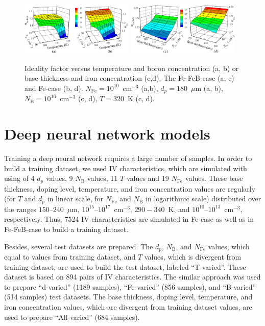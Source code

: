 \documentclass[num-refs]{wiley-article} %
\begin{document}
\begin{figure}[t]
\centering
\includegraphics[width=0.48\textwidth]{Fig1a}
\includegraphics[width=0.48\textwidth]{Fig1b}
\caption{Ideality factor versus temperature and boron concentration (a, b)
or base thickness and iron concentration (c,d).
The Fe-FeB-case (a, c) and Fe-case (b, d).
$N_\mathrm{Fe}=10^{10}$~cm$^{-3}$ (a,b),
$d_p=180$~$\mu$m (a, b),
$N_\mathrm{B}=10^{16}$~cm$^{-3}$ (c, d),
$T=320$~K (c, d).
}
\label{fig_nValues}
\end{figure}

\section{Deep neural network models}

Training a deep neural network requires a large number of samples.
In order to build a training dataset, we used IV characteristics, which
are simulated with using of 4 $d_p$ values, 9 $N_\mathrm{B}$ values, 11 $T$ values and 19 $N_{\mathrm{Fe}}$ values.
These base thickness, doping level, temperature, and iron concentration values are regularly (for $T$ and $d_p$ in linear scale, for $N_{\mathrm{Fe}}$ and $N_\mathrm{B}$ in logarithmic scale) distributed over the  ranges $150$--$240$~$\mu$m, $10^{15}$--$10^{17}$~cm$^{-3}$, $290-340$~K, and
$10^{10}$--$10^{13}$~cm$^{-3}$, respectively.
Thus, 7524 IV characteristics are simulated in Fe-case as well as in Fe-FeB-case to build a training dataset.

Besides, several test datasets are prepared.
The $d_p$, $N_\mathrm{B}$, and $N_{\mathrm{Fe}}$ values, which equal to  values from training dataset, and $T$ values, which is divergent from training dataset, are used to build the test dataset, labeled ``T-varied''.
These dataset is based on 894 pairs of IV characteristics.
The similar approach was used to prepare ``d-varied'' (1189 samples), ``Fe-varied'' (856 samples), and ``B-varied'' (514 samples) test datasets.
The base thickness, doping level, temperature, and iron concentration values, which are divergent from training dataset values, are used to prepare ``All-varied'' (684 samples).
\end{document}
